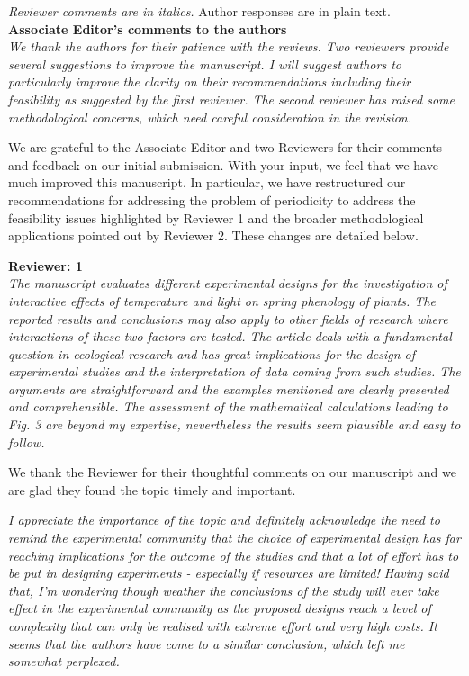 \documentclass[11pt]{article}
\begin{document}
\emph{Reviewer comments are in italics.} Author responses are in plain text.\\


\textbf{Associate Editor's comments to the authors}\\
\emph{We thank the authors for their patience with the reviews. Two reviewers provide several suggestions to improve the manuscript. I will suggest authors to particularly improve the clarity on their recommendations including their feasibility as suggested by the first reviewer. The second reviewer has raised some methodological concerns, which need careful consideration in the revision.}

We are grateful to the Associate Editor and two Reviewers for their comments and feedback on our initial submission. With your input, we feel that we have much improved this manuscript. In particular, we have restructured our recommendations for addressing the problem of periodicity to address the feasibility issues highlighted by Reviewer 1 and the broader methodological applications pointed out by Reviewer 2. These changes are detailed below.

\textbf{Reviewer: 1}\\
\emph{The manuscript evaluates different experimental designs for the investigation of interactive effects of temperature and light on spring phenology of plants. The reported results and conclusions may also apply to other fields of research where interactions of these two factors are tested. The article deals with a fundamental question in ecological research and has great implications for the design of experimental studies and the interpretation of data coming from such studies. The arguments are straightforward and the examples mentioned are clearly presented and comprehensible. The assessment of the mathematical calculations leading to Fig. 3 are beyond my expertise, nevertheless the results seem plausible and easy to follow.}

 We thank the Reviewer for their thoughtful comments on our manuscript and we are glad they found the topic timely and important.

\emph{I appreciate the importance of the topic and definitely acknowledge the need to remind the experimental community that the choice of experimental design has far reaching implications for the outcome of the studies and that a lot of effort has to be put in designing experiments - especially if resources are limited! Having said that, I’m wondering though weather the conclusions of the study will ever take effect in the experimental community as the proposed designs reach a level of complexity that can only be realised with extreme effort and very high costs. It seems that the authors have come to a similar conclusion, which left me somewhat perplexed.}
\end{document}
